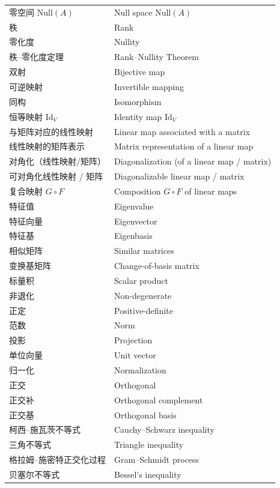 \documentclass{ctexart}
\begin{document}
\begin{center}
\begin{longtable}{|>{\raggedright\arraybackslash}p{5cm}|>{\raggedright\arraybackslash}p{8cm}|}
			零空间 $\mathrm{Null}(A)$ & Null space $\mathrm{Null}(A)$ \\
			秩 & Rank \\
			零化度 & Nullity \\
			秩–零化度定理 & Rank–Nullity Theorem \\
			双射 & Bijective map \\
			可逆映射 & Invertible mapping \\
			同构 & Isomorphism \\
			恒等映射 $\mathrm{Id}_V$ & Identity map $\mathrm{Id}_V$ \\
			与矩阵对应的线性映射 & Linear map associated with a matrix \\
			线性映射的矩阵表示 & Matrix representation of a linear map \\
			对角化（线性映射/矩阵） & Diagonalization (of a linear map / matrix) \\
			可对角化线性映射 / 矩阵 & Diagonalizable linear map / matrix \\
			复合映射 $G\circ F$ & Composition $G\circ F$ of linear maps \\
			特征值 & Eigenvalue \\
			特征向量 & Eigenvector \\
			特征基 & Eigenbasis \\
			相似矩阵 & Similar matrices \\
			变换基矩阵 & Change-of-basis matrix \\
			标量积 & Scalar product \\
			非退化 & Non-degenerate \\
			正定 & Positive-definite \\
			范数 & Norm \\
			投影 & Projection \\
			单位向量 & Unit vector \\
			归一化 & Normalization \\
			正交 & Orthogonal \\
			正交补 & Orthogonal complement \\
			正交基 & Orthogonal basis \\
			柯西–施瓦茨不等式 & Cauchy–Schwarz inequality \\
			三角不等式 & Triangle inequality \\
			格拉姆–施密特正交化过程 & Gram–Schmidt process \\
			贝塞尔不等式 & Bessel's inequality \\
		\end{longtable}
	\end{center}
\end{document}
